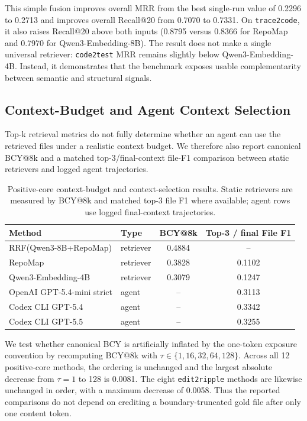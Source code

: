 \documentclass[11pt]{article}
\newcommand{\code}[1]{\texttt{#1}}
\begin{document}
This simple fusion improves overall MRR from the best single-run value of 0.2296 to 0.2713 and improves overall Recall@20 from 0.7070 to 0.7331. On \code{trace2code}, it also raises Recall@20 above both inputs (0.8795 versus 0.8366 for RepoMap and 0.7970 for Qwen3-Embedding-8B). The result does not make a single universal retriever: \code{code2test} MRR remains slightly below Qwen3-Embedding-4B. Instead, it demonstrates that the benchmark exposes usable complementarity between semantic and structural signals.

\subsection{Context-Budget and Agent Context Selection}

Top-k retrieval metrics do not fully determine whether an agent can use the retrieved files under a realistic context budget. We therefore also report canonical BCY@8k and a matched top-3/final-context file-F1 comparison between static retrievers and logged agent trajectories.

\begin{table}[t]
\centering
\caption{Positive-core context-budget and context-selection results. Static retrievers are measured by BCY@8k and matched top-3 file F1 where available; agent rows use logged final-context trajectories.}
\label{tab:context-selection}
\begin{tabular}{llcc}
\toprule
Method & Type & BCY@8k & Top-3 / final File F1 \\
\midrule
RRF(Qwen3-8B+RepoMap) & retriever & 0.4884 & -- \\
RepoMap & retriever & 0.3828 & 0.1102 \\
Qwen3-Embedding-4B & retriever & 0.3079 & 0.1247 \\
OpenAI GPT-5.4-mini strict & agent & -- & 0.3113 \\
Codex CLI GPT-5.4 & agent & -- & 0.3342 \\
Codex CLI GPT-5.5 & agent & -- & 0.3255 \\
\bottomrule
\end{tabular}
\end{table}

We test whether canonical BCY is artificially inflated by the one-token exposure convention by recomputing BCY@8k with \(\tau\in\{1,16,32,64,128\}\). Across all 12 positive-core methods, the ordering is unchanged and the largest absolute decrease from \(\tau=1\) to 128 is 0.0081. The eight \code{edit2ripple} methods are likewise unchanged in order, with a maximum decrease of 0.0058. Thus the reported comparisons do not depend on crediting a boundary-truncated gold file after only one content token.
\end{document}
